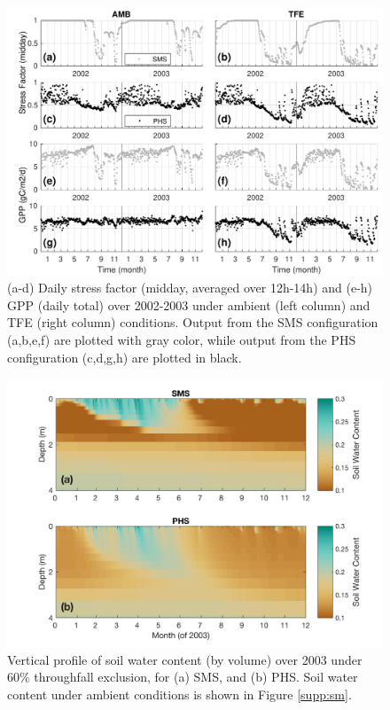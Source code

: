 \documentclass[draft,linenumbers]{agujournal}
\begin{document}
          \clearpage   
  \begin{figure}[h]
     \centering
     \includegraphics[width=30pc]{figs/gpp.pdf}
     \caption{(a-d) Daily stress factor (midday, averaged over 12h-14h) and (e-h) GPP (daily total) over 2002-2003 under ambient (left column) and TFE (right column) conditions.
     Output from the SMS configuration (a,b,e,f) are plotted with gray color, while output from the PHS configuration (c,d,g,h) are plotted in black.
     }
     \label{fig:gpp}
  \end{figure} 



      \clearpage
    \begin{figure}[h]
     \centering
     \includegraphics[width=30pc]{figs/smp.jpg}
     \caption{Vertical profile of soil water content (by volume) over 2003 under 60\% throughfall exclusion, for
     (a) SMS, and 
     (b) PHS.
     Soil water content under ambient conditions is shown in Figure \ref{supp:sm}.
 }
     \label{fig:sm}
  \end{figure}
\end{document}
